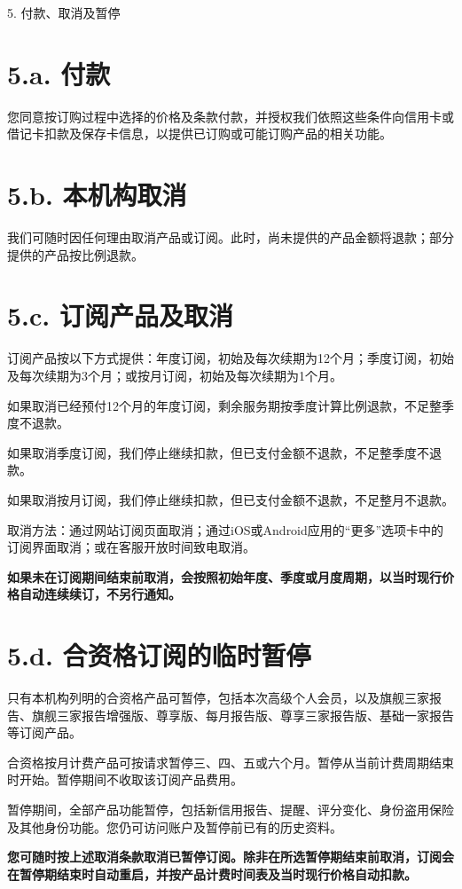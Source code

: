 \documentclass[UTF8,fontset=none,11pt,a4paper]{ctexart}
\begin{document}
5. 付款、取消及暂停


\section*{5.a. 付款}
您同意按订购过程中选择的价格及条款付款，并授权我们依照这些条件向信用卡或借记卡扣款及保存卡信息，以提供已订购或可能订购产品的相关功能。


\section*{5.b. 本机构取消}
我们可随时因任何理由取消产品或订阅。此时，尚未提供的产品金额将退款；部分提供的产品按比例退款。


\section*{5.c. 订阅产品及取消}
订阅产品按以下方式提供：年度订阅，初始及每次续期为12个月；季度订阅，初始及每次续期为3个月；或按月订阅，初始及每次续期为1个月。


如果取消已经预付12个月的年度订阅，剩余服务期按季度计算比例退款，不足整季度不退款。


如果取消季度订阅，我们停止继续扣款，但已支付金额不退款，不足整季度不退款。


如果取消按月订阅，我们停止继续扣款，但已支付金额不退款，不足整月不退款。


取消方法：通过网站订阅页面取消；通过iOS或Android应用的“更多”选项卡中的订阅界面取消；或在客服开放时间致电取消。


\textbf{如果未在订阅期间结束前取消，会按照初始年度、季度或月度周期，以当时现行价格自动连续续订，不另行通知。}


\section*{5.d. 合资格订阅的临时暂停}
只有本机构列明的合资格产品可暂停，包括本次高级个人会员，以及旗舰三家报告、旗舰三家报告增强版、尊享版、每月报告版、尊享三家报告版、基础一家报告等订阅产品。


合资格按月计费产品可按请求暂停三、四、五或六个月。暂停从当前计费周期结束时开始。暂停期间不收取该订阅产品费用。


暂停期间，全部产品功能暂停，包括新信用报告、提醒、评分变化、身份盗用保险及其他身份功能。您仍可访问账户及暂停前已有的历史资料。


\textbf{您可随时按上述取消条款取消已暂停订阅。除非在所选暂停期结束前取消，订阅会在暂停期结束时自动重启，并按产品计费时间表及当时现行价格自动扣款。}
\end{document}
